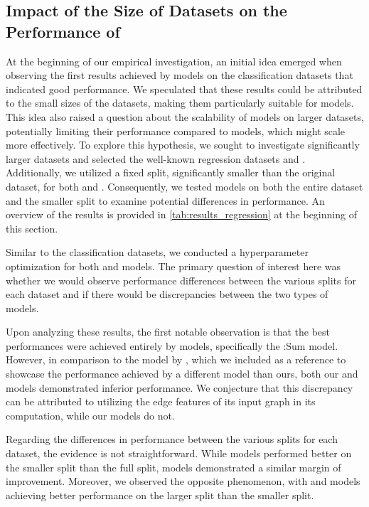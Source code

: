 \FloatBarrier
\subsection{Impact of the Size of Datasets on the Performance of \wlnn}
At the beginning of our empirical investigation, an initial idea emerged when observing the first results achieved by \wlnn models on the classification datasets that indicated good performance. We speculated that these results could be attributed to the small sizes of the datasets, making them particularly suitable for \wlnn models. This idea also raised a question about the scalability of \wlnn models on larger datasets, potentially limiting their performance compared to \gnn models, which might scale more effectively. To explore this hypothesis, we sought to investigate significantly larger datasets and selected the well-known regression datasets \alchemy and \zinc. Additionally, we utilized a fixed split, significantly smaller than the original dataset, for both \alchemy and \zinc. Consequently, we tested \wlnn models on both the entire dataset and the smaller split to examine potential differences in performance. An overview of the results is provided in \cref{tab:results_regression} at the beginning of this section.

Similar to the classification datasets, we conducted a hyperparameter optimization for both \wlnn and \gnn models. The primary question of interest here was whether we would observe performance differences between the various splits for each dataset and if there would be discrepancies between the two types of models.

Upon analyzing these results, the first notable observation is that the best performances were achieved entirely by \gnn models, specifically the \gin:\textsf{Sum} model. However, in comparison to the \textsf{\gineeps} model by \cite{Mor+2020}, which we included as a reference to showcase the performance achieved by a different \gnn model than ours, both our \gnn and \wlnn models demonstrated inferior performance. We conjecture that this discrepancy can be attributed to \textsf{\gineeps} utilizing the edge features of its input graph in its computation, while our models do not.

Regarding the differences in performance between the various splits for each dataset, the evidence is not straightforward. While \wlnn models performed better on the smaller split \alchemyten than the full split, \gnn models demonstrated a similar margin of improvement. Moreover, we observed the opposite phenomenon, with \wlnn and \gnn models achieving better performance on the larger \zinc split than the smaller \zincten split.

